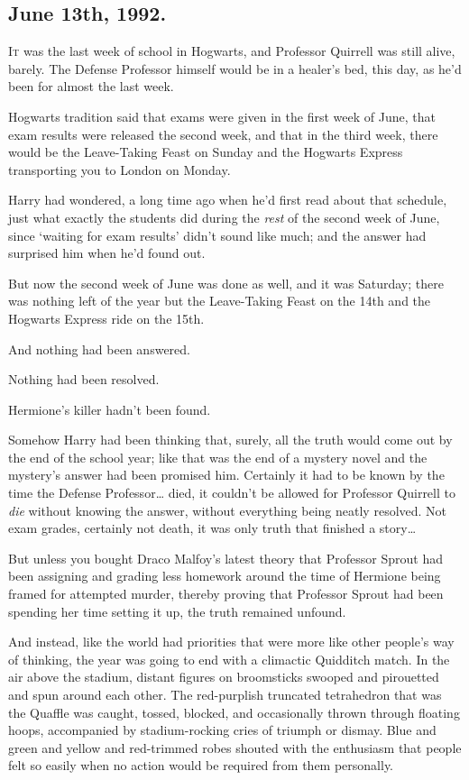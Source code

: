 
\subsection{June 13th, 1992.}

\lettrine{I}{t} was the last week of school in Hogwarts, and Professor Quirrell was still 
alive, barely. The Defense Professor himself would be in a healer's bed, this 
day, as he'd been for almost the last week.

Hogwarts tradition said that exams were given in the first week of June, that 
exam results were released the second week, and that in the third week, there 
would be the Leave-Taking Feast on Sunday and the Hogwarts Express transporting 
you to London on Monday.

Harry had wondered, a long time ago when he'd first read about that schedule, 
just what exactly the students did during the \emph{rest} of the second week of 
June, since `waiting for exam results' didn't sound like much; and the answer 
had surprised him when he'd found out.

But now the second week of June was done as well, and it was Saturday; there 
was nothing left of the year but the Leave-Taking Feast on the 14th and the 
Hogwarts Express ride on the 15th.

And nothing had been answered.

Nothing had been resolved.

Hermione's killer hadn't been found.

Somehow Harry had been thinking that, surely, all the truth would come out by 
the end of the school year; like that was the end of a mystery novel and the 
mystery's answer had been promised him. Certainly it had to be known by the 
time the Defense Professor{\ldots} died, it couldn't be allowed for Professor 
Quirrell to \emph{die} without knowing the answer, without everything being 
neatly resolved. Not exam grades, certainly not death, it was only truth that 
finished a story{\ldots}

But unless you bought Draco Malfoy's latest theory that Professor Sprout had 
been assigning and grading less homework around the time of Hermione being 
framed for attempted murder, thereby proving that Professor Sprout had been 
spending her time setting it up, the truth remained unfound.

And instead, like the world had priorities that were more like other people's 
way of thinking, the year was going to end with a climactic Quidditch match.
\sbreak
In the air above the stadium, distant figures on broomsticks swooped and 
pirouetted and spun around each other. The red-purplish truncated tetrahedron 
that was the Quaffle was caught, tossed, blocked, and occasionally thrown 
through floating hoops, accompanied by stadium-rocking cries of triumph or 
dismay. Blue and green and yellow and red-trimmed robes shouted with the 
enthusiasm that people felt so easily when no action would be required from 
them personally.

